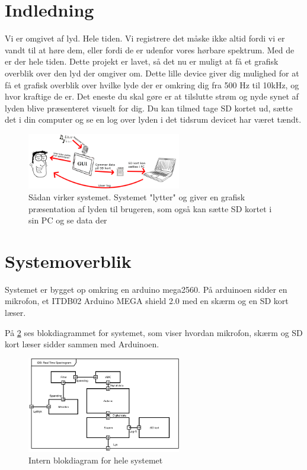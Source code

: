 %

%
	
\section{Indledning}
Vi er omgivet af lyd. Hele tiden. Vi registrere det måske ikke altid fordi vi er vandt til at høre dem, eller fordi de er udenfor vores hørbare spektrum. Med de er der hele tiden.
Dette projekt er lavet, så det nu er muligt at få et grafisk overblik over den lyd der omgiver om.
Dette lille device giver dig mulighed for at få et grafisk overblik over hvilke lyde der er omkring dig fra 500 Hz til 10kHz, og hvor kraftige de er.
Det eneste du skal gøre er at tilslutte strøm og nyde synet af lyden blive præsenteret visuelt for dig.
Du kan tilmed tage SD kortet ud, sætte det i din computer og se en log over lyden i det tidsrum devicet har været tændt.

\cite{fht_arduino}

\begin{figure}[H]
	\center
	\includegraphics[width = 0.6\textwidth]{Figur/Rigt_billede.png}
	\caption{Sådan virker systemet. Systemet "lytter" og giver en grafisk præsentation af lyden til brugeren, som også kan sætte SD kortet i sin PC og se data der}
	\label{fig:ibd}
\end{figure}


\section{Systemoverblik}
Systemet er bygget op omkring en arduino mega2560. På arduinoen sidder en mikrofon, et ITDB02 Arduino MEGA shield 2.0 med en skærm og en SD kort læser.

På \ref{fig:ibd} ses blokdiagrammet for systemet, som viser hvordan mikrofon, skærm og SD kort læser sidder sammen med Arduinoen.

\begin{figure}[H]
	\center
	\includegraphics[width = 0.6\textwidth]{Figur/IBD.pdf}
	\caption{Intern blokdiagram for hele systemet}
	\label{fig:ibd}
\end{figure}

